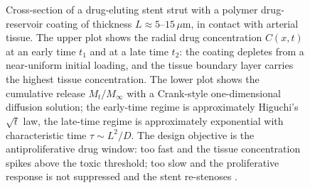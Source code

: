\begin{figure}[htbp]
\caption[Drug-eluting stent cross-section]{Cross-section of a
drug-eluting stent strut with a polymer drug-reservoir coating of
thickness $L \approx 5\text{--}15\,\mu\text{m}$, in contact with
arterial tissue. The upper plot shows the radial drug
concentration $C(x, t)$ at an early time $t_1$ and at a late time
$t_2$: the coating depletes from a near-uniform initial loading,
and the tissue boundary layer carries the highest tissue
concentration. The lower plot shows the cumulative release
$M_t/M_\infty$ with a Crank-style one-dimensional diffusion solution;
the early-time regime is approximately Higuchi's
$\sqrt{t}$ law, the late-time regime is approximately
exponential with characteristic time $\tau \sim L^2/D$. The
design objective is the antiproliferative drug
window: too fast and the tissue concentration spikes above the
toxic threshold; too slow and the proliferative response is not
suppressed and the stent re-stenoses
\cite{paper:v6c12-crank-diffusion-1975,
paper:v6c12-higuchi-drug-release-1961,
paper:v6c12-stone-des-2010,
paper:v6c12-finn-des-pathology-2007}.}
\label{fig:vol06:ch12:des-cross-section}
\end{figure}
